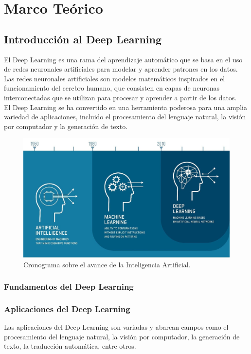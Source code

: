 \documentclass{article}
\begin{document}
\newpage

\section{Marco Teórico}
\subsection{Introducción al Deep Learning}
El Deep Learning es una rama del aprendizaje automático que se basa en el uso de redes neuronales artificiales para modelar y aprender patrones en los datos.
Las redes neuronales artificiales son modelos matemáticos inspirados en el funcionamiento del cerebro humano, que consisten en capas de neuronas interconectadas que se utilizan para procesar y aprender a partir de los datos. \\

El Deep Learning se ha convertido en una herramienta poderosa para una amplia variedad de aplicaciones, incluido el procesamiento del lenguaje natural, la visión por computador y la generación de texto.

\begin{figure}[H]
    \centering
    \includegraphics[scale=0.2]{history.png}
    \caption{Cronograma sobre el avance de la Inteligencia Artificial. \cite{tjk2024deep}}
\end{figure}

\newpage

\subsubsection{Fundamentos del Deep Learning}

\subsubsection{Aplicaciones del Deep Learning}
Las aplicaciones del Deep Learning son variadas y abarcan campos como el procesamiento del lenguaje natural, la visión por computador, la generación de texto, la traducción automática, entre otros.
\end{document}
